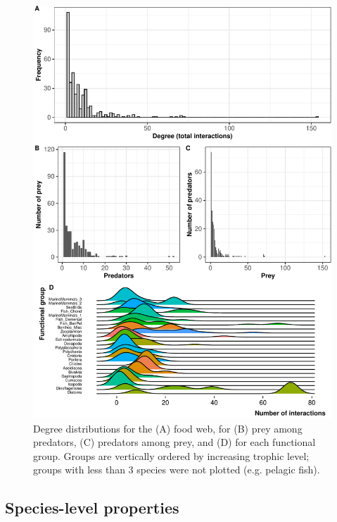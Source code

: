 \documentclass[preprint, 3p,
authoryear]{elsarticle} %
\begin{document}
\begin{figure}

{\centering \includegraphics{MS_Burdwood_foodweb_files/figure-latex/figure3-1} 

}

\caption{Degree distributions for the (A) food web, for (B) prey among predators, (C) predators among prey, and (D) for each functional group. Groups are vertically ordered by increasing trophic level; groups with less than 3 species were not plotted (e.g. pelagic fish).}\label{fig:figure3}
\end{figure}

\hypertarget{species-level-properties}{%
\subsection{Species-level properties}\label{species-level-properties}}
\end{document}
